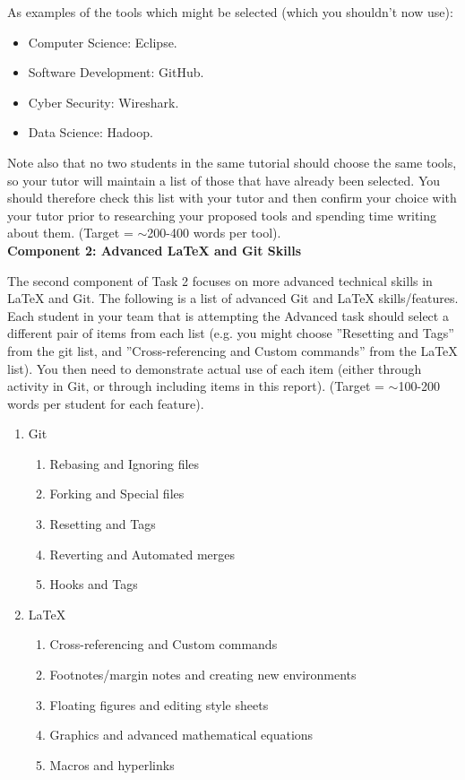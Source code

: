 \documentclass[a4paper, 11pt]{report}
\begin{document}
As examples of the tools which might be selected (which you shouldn’t now use):
\begin{itemize}
\item Computer Science: Eclipse.
\item Software Development: GitHub. 
\item Cyber Security: Wireshark. 
\item Data Science: Hadoop.
\end{itemize}

Note also that no two students in the same tutorial should choose the same tools, so your tutor will maintain a list of those that have already been selected. You should therefore check this list with your tutor and then confirm your choice with your tutor prior to researching your proposed tools and spending time writing about them. (Target = $\sim$200-400 words per tool).\\[2mm]

\textbf{Component 2: Advanced LaTeX and Git Skills}

The second component of Task 2 focuses on more advanced technical skills in LaTeX and Git. The following is a list of advanced Git and LaTeX skills/features. Each student in your team that is attempting the Advanced task should select a different pair of items from each list (e.g. you might choose ''Resetting and Tags'' from the git list, and ''Cross-referencing and Custom commands'' from the LaTeX list). You then need to demonstrate actual use of each item (either through activity in Git, or through including items in this report). (Target = $\sim$100-200 words per student for each feature).

\begin{enumerate}
\item{Git}
	\begin{enumerate}
	\item Rebasing and Ignoring files 
	\item Forking and Special files 
	\item Resetting and Tags 
	\item Reverting and Automated merges 
	\item Hooks and Tags 
	\end{enumerate}
\item LaTeX 
	\begin{enumerate}
	\item Cross-referencing and Custom commands 
	\item Footnotes/margin notes and creating new environments 
	\item Floating figures and editing style sheets 
	\item Graphics and advanced mathematical equations 
	\item Macros and hyperlinks
	\end{enumerate}
\end{enumerate}
~\\[2mm]
\end{document}
